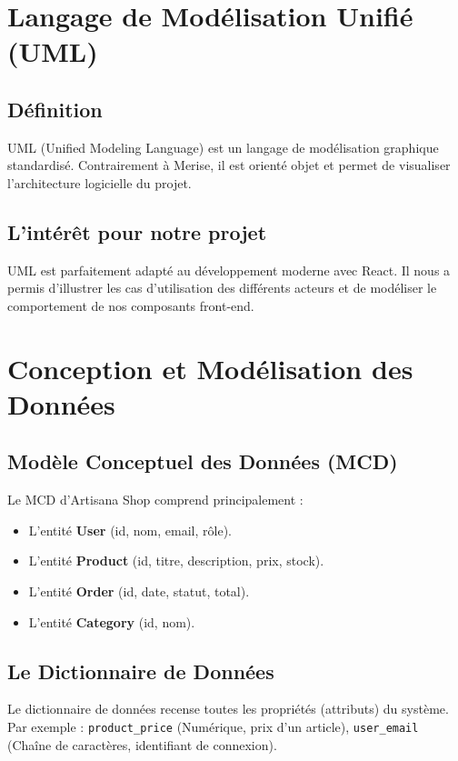 \documentclass[12pt,a4paper]{report}
\begin{document}
\section{Langage de Modélisation Unifié (UML)}

\subsection{Définition}
UML (Unified Modeling Language) est un langage de modélisation graphique standardisé. Contrairement à Merise, il est orienté objet et permet de visualiser l'architecture logicielle du projet.

\subsection{L’intérêt pour notre projet}
UML est parfaitement adapté au développement moderne avec React. Il nous a permis d'illustrer les cas d'utilisation des différents acteurs et de modéliser le comportement de nos composants front-end.

\section{Conception et Modélisation des Données}

\subsection{Modèle Conceptuel des Données (MCD)}
Le MCD d'Artisana Shop comprend principalement :
\begin{itemize}
    \item L'entité \textbf{User} (id, nom, email, rôle).
    \item L'entité \textbf{Product} (id, titre, description, prix, stock).
    \item L'entité \textbf{Order} (id, date, statut, total).
    \item L'entité \textbf{Category} (id, nom).
\end{itemize}

\subsection{Le Dictionnaire de Données}
Le dictionnaire de données recense toutes les propriétés (attributs) du système. Par exemple : \texttt{product\_price} (Numérique, prix d'un article), \texttt{user\_email} (Chaîne de caractères, identifiant de connexion).
\end{document}
